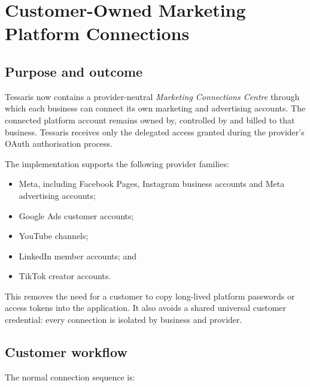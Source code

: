 
\section{Customer-Owned Marketing Platform Connections}
\label{sec:customer-owned-marketing-connections}

\subsection{Purpose and outcome}

Tessaris now contains a provider-neutral \emph{Marketing Connections Centre} through which each business can connect its own marketing and advertising accounts. The connected platform account remains owned by, controlled by and billed to that business. Tessaris receives only the delegated access granted during the provider's OAuth authorisation process.

The implementation supports the following provider families:

\begin{itemize}
    \item Meta, including Facebook Pages, Instagram business accounts and Meta advertising accounts;
    \item Google Ads customer accounts;
    \item YouTube channels;
    \item LinkedIn member accounts; and
    \item TikTok creator accounts.
\end{itemize}

This removes the need for a customer to copy long-lived platform passwords or access tokens into the application. It also avoids a shared universal customer credential: every connection is isolated by business and provider.

\subsection{Customer workflow}

The normal connection sequence is:

